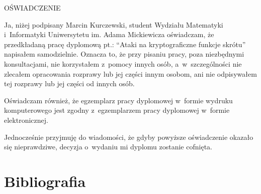\documentclass[12pt,a4paper,twoside]{article}
\begin{document}
\newpage
\thispagestyle{empty}
\begin{center}
    OŚWIADCZENIE
\end{center}

Ja, niżej podpisany Marcin Kurczewski, student Wydziału Matematyki
i~Informatyki Uniwersytetu im. Adama Mickiewicza oświadczam, że przedkładaną
pracę dyplomową pt.: ``Ataki na kryptograficzne funkcje skrótu'' napisałem
samodzielnie. Oznacza to, że przy pisaniu pracy, poza niezbędnymi
konsultacjami, nie korzystałem z~pomocy innych osób, a~w~szczególności nie
zlecałem opracowania rozprawy lub jej części innym osobom, ani nie odpisywałem
tej rozprawy lub jej części od innych osób.

Oświadczam również, że egzemplarz pracy dyplomowej w~formie wydruku
komputerowego jest zgodny z~egzemplarzem pracy dyplomowej w~formie
elektronicznej.

Jednocześnie przyjmuję do wiadomości, że gdyby powyższe oświadczenie okazało
się nieprawdziwe, decyzja o~wydaniu mi dyplomu zostanie cofnięta.


\newpage
\setcounter{tocdepth}{3}
\tableofcontents

\newpage
\pagestyle{fancy}









\newpage
\section{Bibliografia}
\begingroup
\renewcommand{\section}[2]{}


\endgroup
\end{document}
